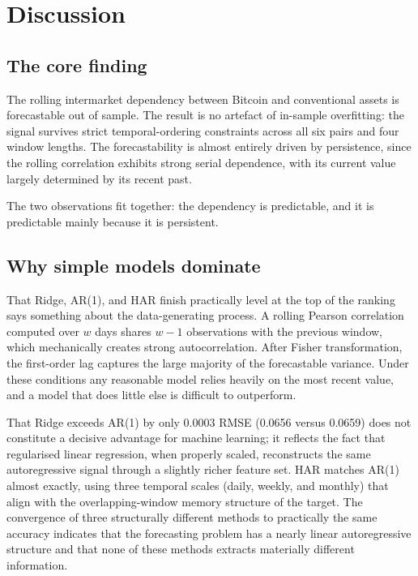 \section{Discussion}
\label{sec:discussion}

\subsection{The core finding}

The rolling intermarket dependency between Bitcoin and conventional assets is forecastable out of sample. The result is no artefact of in-sample overfitting: the signal survives strict temporal-ordering constraints across all six pairs and four window lengths. The forecastability is almost entirely driven by persistence, since the rolling correlation exhibits strong serial dependence, with its current value largely determined by its recent past.

The two observations fit together: the dependency is predictable, and it is predictable mainly because it is persistent.

\subsection{Why simple models dominate}

That Ridge, AR(1), and HAR finish practically level at the top of the ranking says something about the data-generating process. A rolling Pearson correlation computed over $w$ days shares $w-1$ observations with the previous window, which mechanically creates strong autocorrelation. After Fisher transformation, the first-order lag captures the large majority of the forecastable variance. Under these conditions any reasonable model relies heavily on the most recent value, and a model that does little else is difficult to outperform.

That Ridge exceeds AR(1) by only 0.0003 RMSE (0.0656 versus 0.0659) does not constitute a decisive advantage for machine learning; it reflects the fact that regularised linear regression, when properly scaled, reconstructs the same autoregressive signal through a slightly richer feature set. HAR matches AR(1) almost exactly, using three temporal scales (daily, weekly, and monthly) that align with the overlapping-window memory structure of the target. The convergence of three structurally different methods to practically the same accuracy indicates that the forecasting problem has a nearly linear autoregressive structure and that none of these methods extracts materially different information.

